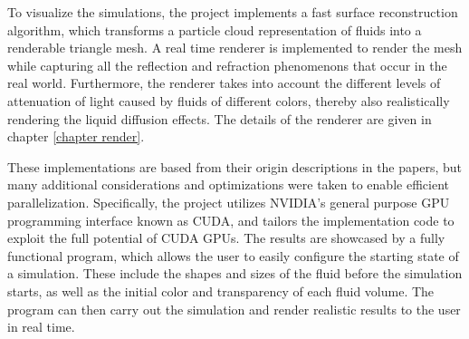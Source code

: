 To visualize the simulations, the project implements a fast surface reconstruction algorithm, which transforms a particle cloud representation of fluids into a renderable triangle mesh. A real time renderer is implemented to render the mesh while capturing all the reflection and refraction phenomenons that occur in the real world. Furthermore, the renderer takes into account the different levels of attenuation of light caused by fluids of different colors, thereby also realistically rendering the liquid diffusion effects. The details of the renderer are given in chapter \ref{chapter render}.

These implementations are based from their origin descriptions in the papers, but many additional considerations and optimizations were taken to enable efficient parallelization. Specifically, the project utilizes NVIDIA's general purpose GPU programming interface known as CUDA, and tailors the implementation code to exploit the full potential of CUDA GPUs. The results are showcased by a fully functional program, which allows the user to easily configure the starting state of a simulation. These include the shapes and sizes of the fluid before the simulation starts, as well as the initial color and transparency of each fluid volume. The program can then carry out the simulation and render realistic results to the user in real time.